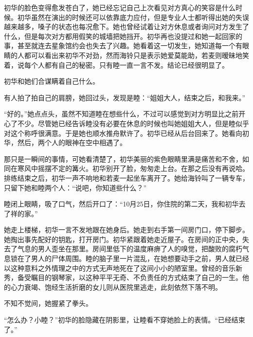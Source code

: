 \documentclass{article}
\begin{document}
初华的脸色变得愈发苍白了，她已经忘记自己上次看见对方真心的笑容是什么时候。初华虽然在演出的时候还可以依靠底力应付，但是专业人士都听得出她的失误越来越多，嗓子的状态也每况愈下。她也曾经试着让对方休息或者询问对方发生了什么，但是每次对方都用假笑的城墙把她挡开。初华再也没提过和她一起回家的事，甚至就连去星象馆约会也失去了兴趣。她看着这一切发生，她知道每一个有眼睛的人都可以看出来初华不对劲，然而海铃只是表示她爱莫能助，若麦则暧昧地笑着，说每个人都有自己的秘密。只有睦一直一言不发。结论已经很明显了。



初华和她们合谋瞒着自己什么。



有人拍了拍自己的肩膀，她回过头，发现是睦：“姐姐大人，结束之后，和我来。”



“好的。”她点点头，虽然不知道睦在想些什么，不过可以感觉到对方明显比之前开心了不少。尽管她已经告诉睦没有必要在休息的时候也叫她姐姐大人，但是睦似乎对这个称呼很满意。于是她也顺水推舟默许了。初华已经从后台回来了。她看向初华，然后，两个人的眼神在空中相遇了。



那只是一瞬间的事情，可她看清楚了，初华美丽的紫色眼睛里满是痛苦和不舍，如同在寒风中摇摆不定的篝火。初华别开了脸，匆匆走上台。在那之后没有再说哈。排练结束之后，初华一声不响地和若麦一起坐车离开了。她给海铃叫了一辆专车，只留下她和睦两个人：“说吧，你知道些什么？”



睦闭上眼睛，吸了口气，然后开口了：“10月25日，你住院的第二天，我和初华去了祥的家。”



\newpage



她走上楼梯，初华一言不发地跟在她身后。她走到右手第一间房门口，停下脚步。她掏出事先配好的钥匙，打开房门。初华紧跟着她走近屋子。在房间的正中央，失去了气息的男人歪坐在那里。房间里低下的温度麻痹了人的嗅觉，把酸败的腐朽气息锁在了男人的尸体周围。睦的脑子里一片混乱，在她想要动手之前，男人就已经以这种意料之外情理之中的方式无声地死在了这间小小的陋室里。曾经的音乐新秀，备受瞩目的钢琴家，以这种平平无奇、不负责任的方式结束了自己的一生。他的心力衰竭、饱经生活折磨的女儿则从医院里逃走，此刻依然下落不明。



不知不觉间，她握紧了拳头。



“怎么办？小睦？”初华的脸隐藏在阴影里，让睦看不穿她脸上的表情。“已经结束了。”
\end{document}
